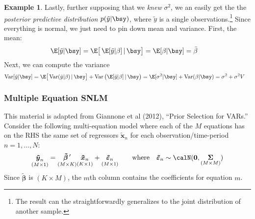 \documentclass[12pt]{article}
\theoremstyle{plain}
\theoremstyle{definition}
\newtheorem{ex}[thm]{Example}
\theoremstyle{remark}
\newcommand{\bsSigma}{\boldsymbol{\Sigma}}
\newcommand{\bstildebeta}{\boldsymbol{\tilde{\beta}}}
\newcommand{\bstildey}{\boldsymbol{\tilde{y}}}
\newcommand{\bstildex}{\boldsymbol{\tilde{x}}}
\newcommand{\bstildevarepsilon}{\boldsymbol{\tilde{\varepsilon}}}
\renewcommand{\bso}{\boldsymbol{0}}
\newcommand{\Var}{\operatorname{Var}}
\begin{document}
\begin{ex}
Lastly, further supposing that we \emph{knew} $\sigma^2$, we an easily
get the the \emph{posterior predictive distribution}
$p(\tilde{y}|\bsy)$, where $\tilde{y}$ is a single
observations.\footnote{
  The result can the straightforwardly generalizes to the joint
  distribution of another sample.
}
Since everything is normal, we just need to pin down mean and variance.
First, the mean:
\begin{align*}
  \E[\tilde{y} | \bsy ]
  &= \E\big[\, \E[\tilde{y}|\beta] \,|\, \bsy \big]
  = \E[\beta|\bsy]
  = \bar{\beta}
\end{align*}
Next, we can compute the variance
\begin{align*}
	 \Var[\tilde{y} | \bsy ]
   &=
    \E\big[ \Var(\tilde{y} | \beta) \,|\,  \bsy \big]
	    + \Var\big( \E[\tilde{y} | \beta] \,|\, \bsy \big)
	 = \E[ \sigma^2 | \bsy ] + \Var( \beta | \bsy)
	 = \sigma^2 + \sigma^2 V
\end{align*}
\end{ex}


\clearpage
\subsubsection{Multiple Equation SNLM}

This material is adapted from Giannone et al (2012), ``Prior Selection
for VARs.''
Consider the following multi-equation model where each of the $M$
equations has on the RHS the same set of regressors $\bstildex_n$ for
each observation/time-period $n=1,\ldots,N$:
\begin{align*}
  \underset{(M\times 1)}{\bstildey_n\vphantom{\varepsilon_n}}
  =
  \underset{(M\times K)}{\bstildebeta\,'\vphantom{\varepsilon_n}}
  \underset{(K\times 1)}{\bstildex_n\vphantom{\varepsilon_n}}
  + \underset{(M\times 1)}{\bstildevarepsilon_n}
  \qquad \text{where}\quad
  \bstildevarepsilon_n\sim
  \calN(\bso,\underset{(M\times M)}{\bsSigma})
\end{align*}
Since $\bstildebeta$ is $(K\times M)$, the $m$th column contains the
coefficients for equation $m$.
\end{document}
